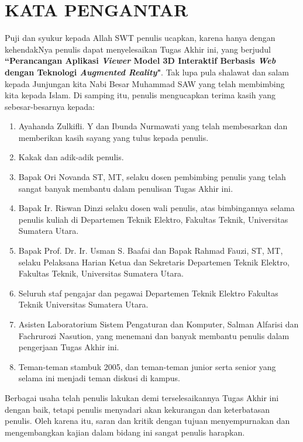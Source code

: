 \chapter*{KATA PENGANTAR}

Puji dan syukur kepada Allah SWT penulis ucapkan, karena hanya dengan kehendakNya penulis dapat menyelesaikan Tugas Akhir ini, yang berjudul \textbf{``Perancangan Aplikasi \textit{Viewer} Model 3D Interaktif Berbasis \textit{Web} dengan Teknologi \textit{Augmented Reality}"}. Tak lupa pula shalawat dan salam kepada Junjungan kita Nabi Besar Muhammad SAW yang telah membimbing kita kepada Islam. Di samping itu, penulis mengucapkan terima kasih yang sebesar-besarnya kepada:

\begin{enumerate}
\item Ayahanda Zulkifli. Y dan Ibunda Nurmawati yang telah membesarkan dan memberikan kasih sayang yang tulus kepada penulis.
\item Kakak dan adik-adik penulis.
\item Bapak Ori Novanda ST, MT, selaku dosen pembimbing penulis yang telah sangat banyak membantu dalam penulisan Tugas Akhir ini.
\item Bapak Ir. Riswan Dinzi selaku dosen wali penulis, atas bimbingannya selama penulis kuliah di Departemen Teknik Elektro, Fakultas Teknik, Universitas Sumatera Utara.
\item Bapak Prof. Dr. Ir. Usman S. Baafai dan Bapak Rahmad Fauzi, ST, MT, selaku Pelaksana Harian Ketua dan Sekretaris Departemen Teknik Elektro, Fakultas Teknik, Universitas Sumatera Utara.
\item Seluruh staf pengajar dan pegawai Departemen Teknik Elektro Fakultas Teknik Universitas Sumatera Utara.
\item Asisten Laboratorium Sistem Pengaturan dan Komputer, Salman Alfarisi dan Fachrurozi Nasution, yang menemani dan banyak membantu penulis dalam pengerjaan Tugas Akhir ini.
\item Teman-teman stambuk 2005, dan teman-teman junior serta senior yang selama ini menjadi teman diskusi di kampus.

\end{enumerate}
Berbagai usaha telah penulis lakukan demi terselesaikannya Tugas Akhir ini dengan baik, tetapi penulis menyadari akan kekurangan dan keterbatasan penulis. Oleh karena itu, saran dan kritik dengan tujuan menyempurnakan dan mengembangkan kajian dalam bidang ini sangat penulis harapkan.

